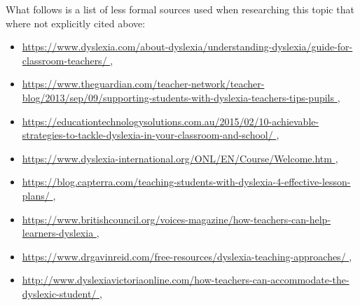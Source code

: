 \documentclass[17pt]{memoir}
\begin{document}
What follows is a list of less formal sources used when researching this topic that where not explicitly cited above:
\begin{itemize}
	\item \href{https://www.dyslexia.com/about-dyslexia/understanding-dyslexia/guide-for-classroom-teachers/
}{https://www.dyslexia.com/about-dyslexia/understanding-dyslexia/guide-for-classroom-teachers/
},
	\item \href{https://www.theguardian.com/teacher-network/teacher-blog/2013/sep/09/supporting-students-with-dyslexia-teachers-tips-pupils
}{https://www.theguardian.com/teacher-network/teacher-blog/2013/sep/09/supporting-students-with-dyslexia-teachers-tips-pupils
},
	\item \href{https://educationtechnologysolutions.com.au/2015/02/10-achievable-strategies-to-tackle-dyslexia-in-your-classroom-and-school/
}{https://educationtechnologysolutions.com.au/2015/02/10-achievable-strategies-to-tackle-dyslexia-in-your-classroom-and-school/
},
	\item \href{https://www.dyslexia-international.org/ONL/EN/Course/Welcome.htm
}{https://www.dyslexia-international.org/ONL/EN/Course/Welcome.htm
},
	\item \href{https://blog.capterra.com/teaching-students-with-dyslexia-4-effective-lesson-plans/
}{https://blog.capterra.com/teaching-students-with-dyslexia-4-effective-lesson-plans/
},
	\item \href{https://www.britishcouncil.org/voices-magazine/how-teachers-can-help-learners-dyslexia
}{https://www.britishcouncil.org/voices-magazine/how-teachers-can-help-learners-dyslexia
},
	\item \href{https://www.drgavinreid.com/free-resources/dyslexia-teaching-approaches/
}{https://www.drgavinreid.com/free-resources/dyslexia-teaching-approaches/
},
	\item \href{http://www.dyslexiavictoriaonline.com/how-teachers-can-accommodate-the-dyslexic-student/
}{http://www.dyslexiavictoriaonline.com/how-teachers-can-accommodate-the-dyslexic-student/
},

\end{itemize}


 
\end{document}
